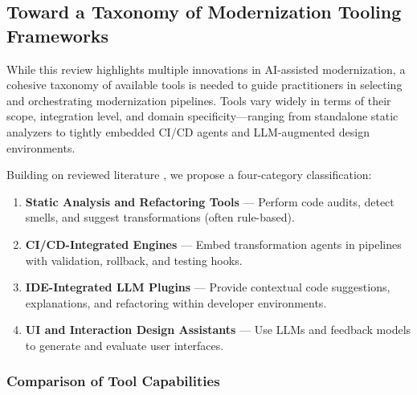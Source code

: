 \documentclass[12pt]{article}
\begin{document}
\subsection{Toward a Taxonomy of Modernization Tooling Frameworks}

While this review highlights multiple innovations in AI-assisted modernization, a cohesive taxonomy of available tools is needed to guide practitioners in selecting and orchestrating modernization pipelines. Tools vary widely in terms of their scope, integration level, and domain specificity—ranging from standalone static analyzers to tightly embedded CI/CD agents and LLM-augmented design environments.

Building on reviewed literature \cite{llmigrate2025, wu2024uicoder, geng2024, googlemigrate2025, zhao2024uxagent}, we propose a four-category classification:

\begin{enumerate}
    \item \textbf{Static Analysis and Refactoring Tools} — Perform code audits, detect smells, and suggest transformations (often rule-based).
    \item \textbf{CI/CD-Integrated Engines} — Embed transformation agents in pipelines with validation, rollback, and testing hooks.
    \item \textbf{IDE-Integrated LLM Plugins} — Provide contextual code suggestions, explanations, and refactoring within developer environments.
    \item \textbf{UI and Interaction Design Assistants} — Use LLMs and feedback models to generate and evaluate user interfaces.
\end{enumerate}

\subsubsection{Comparison of Tool Capabilities}
\end{document}
